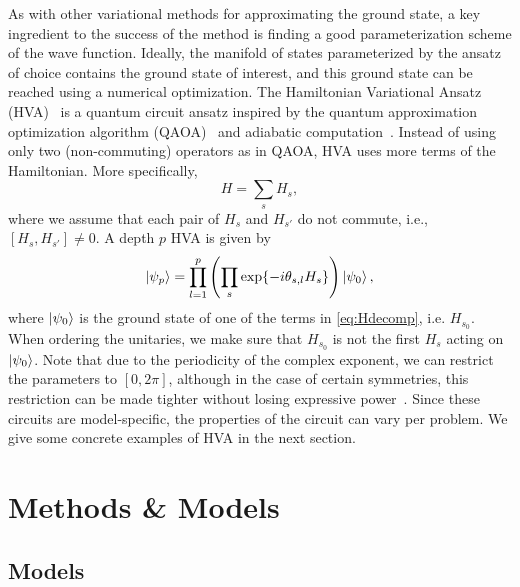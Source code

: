 \documentclass[
 aps,
 pra,
 showpacs,
 showkeys,
 superscriptaddress,
 reprint,%
twocolumn,
]{revtex4-1}
\begin{document}
As with other variational methods for approximating the ground state, a key ingredient to the success of the method is finding a good parameterization scheme of the wave function. Ideally, the manifold of states parameterized by the ansatz of choice contains the ground state of interest, and this ground state can be reached using a numerical optimization. The Hamiltonian Variational Ansatz (HVA)~\cite{Wecker2015} is a quantum circuit ansatz inspired by the quantum approximation optimization algorithm (QAOA)~\cite{farhi2014quantum} and adiabatic computation~\cite{farhi2000quantum}. Instead of using only two (non-commuting) operators as in QAOA, HVA uses more terms of the Hamiltonian. More specifically, 
\begin{equation}
    H = \sum_s H_s,\label{eq:Hdecomp}
\end{equation}
where we assume that each pair of $H_s$ and $H_{s'}$ do not commute, i.e., $[H_s, H_{s'}] \neq 0$. A depth $p$ HVA is given by
\begin{equation}\label{eq:hva}
    \ket{\psi_p} = \prod_{l=1}^p \left(\prod_s \exp{-i \theta_{s,l} H_s}\right)\ket{\psi_0},
\end{equation}
where $\ket{\psi_0}$ is the ground state of one of the terms in \cref{eq:Hdecomp}, i.e. $H_{s_0}$. When ordering the unitaries, we make sure that $H_{s_0}$ is not the first $H_s$ acting on $\ket{\psi_0}$. Note that due to the periodicity of the complex exponent, we can restrict the parameters to $[0, 2\pi]$, although in the case of certain symmetries, this restriction can be made tighter without losing expressive power~\cite{Ho2019}. Since these circuits are model-specific, the properties of the circuit can vary per problem. We give some concrete examples of HVA in the next section. 


\section{Methods \& Models}\label{sec:methods}

    \subsection{Models}\label{sec:models}
\end{document}
